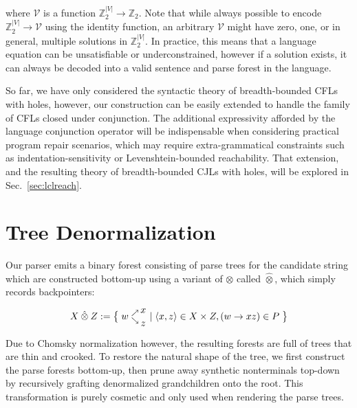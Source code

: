 \documentclass[sigplan,review,anonymous,acmsmall]{acmart}\settopmatter{printfolios=false,printccs=false,printacmref=false}
\begin{document}
\noindent where $\mathcal{V}$ is a function $\mathbb{Z}_2^{|V|}\rightarrow\mathbb{Z}_2$. Note that while always possible to encode $\mathbb{Z}_2^{|V|} \rightarrow \mathcal{V}$ using the identity function, an arbitrary $\mathcal{V}$ might have zero, one, or in general, multiple solutions in $\mathbb{Z}_2^{|V|}$. In practice, this means that a language equation can be unsatisfiable or underconstrained, however if a solution exists, it can always be decoded into a valid sentence and parse forest in the language.

So far, we have only considered the syntactic theory of breadth-bounded CFLs with holes, however, our construction can be easily extended to handle the family of CFLs closed under conjunction. The additional expressivity afforded by the language conjunction operator will be indispensable when considering practical program repair scenarios, which may require extra-grammatical constraints such as indentation-sensitivity or Levenshtein-bounded reachability. That extension, and the resulting theory of breadth-bounded CJLs with holes, will be explored in Sec.~\ref{sec:lclreach}.

\pagebreak\section{Tree Denormalization}


Our parser emits a binary forest consisting of parse trees for the candidate string which are constructed bottom-up using a variant of $\otimes$ called $\hat{\otimes}$, which simply records backpointers:

\begin{align}
   X\:\hat{\otimes}\:Z := \big\{\;w\hphantom{.}^{\nearrow}_{\searrow}\nobarfrac{x}{z} \mid \langle x, z\rangle \in X \times Z, (w\rightarrow xz) \in P\;\big\}
\end{align}

Due to Chomsky normalization however, the resulting forests are full of trees that are thin and crooked. To restore the natural shape of the tree, we first construct the parse forests bottom-up, then prune away synthetic nonterminals top-down by recursively grafting denormalized grandchildren onto the root. This transformation is purely cosmetic and only used when rendering the parse trees.
\end{document}
